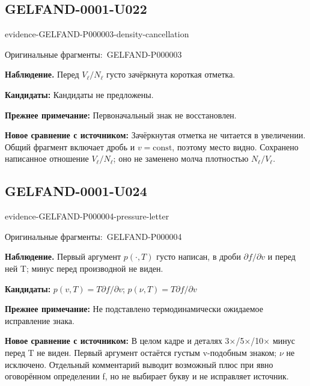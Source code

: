\documentclass[11pt]{article}
\newcommand{\EvidenceBlock}[4]{%
 \par\smallskip\noindent\begin{minipage}{\linewidth}
 \begin{minipage}[t]{.47\linewidth}\vspace{0pt}\centering
 \csname evidence-#1-#2\endcsname\par
 {\scriptsize\SourceCropCaption\ #1}\par
 \end{minipage}\hfill
 \begin{minipage}[t]{.49\linewidth}\vspace{0pt}\raggedright
 {\small\color{orange!65!black}\textbf{#4} #3}\par
 \end{minipage}
 \end{minipage}\par\smallskip}
\newcommand{\SourceCropCaption}{Оригинальные фрагменты:}\newcommand{\ReadingCaption}{Сомнительное чтение.}\newcommand{\IncompleteCaption}{Неразобранный фрагмент.}\newcommand{\DiagramCaption}{Рисунок и набранное описание.}
\begin{document}
\subsection*{GELFAND-0001-U022}
\EvidenceBlock{GELFAND-P000003}{density-cancellation}{Перед \(V_\ell/N_\ell\) густо зачёркнута короткая отметка.}{Наблюдение.}
\par\smallskip\noindent\textbf{Кандидаты: } Кандидаты не предложены.\par
\par\smallskip\noindent\textbf{Прежнее примечание: } Первоначальный знак не восстановлен.\par
\par\smallskip\noindent\textbf{Новое сравнение с источником: } Зачёркнутая отметка не читается в увеличении. Общий фрагмент включает дробь и \(v=\mathrm{const}\), поэтому место видно. Сохранено написанное отношение \(V_\ell/N_\ell\); оно не заменено молча плотностью \(N_\ell/V_\ell\).\par


\subsection*{GELFAND-0001-U024}
\EvidenceBlock{GELFAND-P000004}{pressure-letter}{Первый аргумент \(p(\cdot,T)\) густо написан, в дроби \(\partial f/\partial v\) и перед ней T; минус перед производной не виден.}{Наблюдение.}
\par\smallskip\noindent\textbf{Кандидаты: } \(p(v,T)=T\partial f/\partial v\); \(p(\nu,T)=T\partial f/\partial v\)\par
\par\smallskip\noindent\textbf{Прежнее примечание: } Не подставлено термодинамически ожидаемое исправление знака.\par
\par\smallskip\noindent\textbf{Новое сравнение с источником: } В целом кадре и деталях 3×/5×/10× минус перед T не виден. Первый аргумент остаётся густым v-подобным знаком; \(\nu\) не исключено. Отдельный комментарий выводит возможный плюс при явно оговорённом определении f, но не выбирает букву и не исправляет источник.\par
\end{document}
